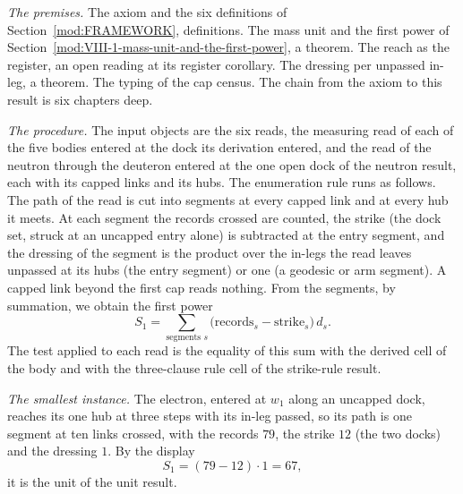 \begin{chproof}
\textit{The premises.} The axiom and the six definitions of Section~\ref{mod:FRAMEWORK}, definitions. The mass unit and the first power of Section~\ref{mod:VIII-1-mass-unit-and-the-first-power}, a theorem. The reach as the register, an open reading at its register corollary. The dressing per unpassed in-leg, a theorem. The typing of the cap census. The chain from the axiom to this result is six chapters deep.

\textit{The procedure.} The input objects are the six reads, the measuring read of each of the five bodies entered at the dock its derivation entered, and the read of the neutron through the deuteron entered at the one open dock of the neutron result, each with its capped links and its hubs. The enumeration rule runs as follows. The path of the read is cut into segments at every capped link and at every hub it meets. At each segment the records crossed are counted, the strike (the dock set, struck at an uncapped entry alone) is subtracted at the entry segment, and the dressing of the segment is the product over the in-legs the read leaves unpassed at its hubs (the entry segment) or one (a geodesic or arm segment). A capped link beyond the first cap reads nothing. From the segments, by summation, we obtain the first power
\begin{equation}
S_1=\sum_{\text{segments }s}\bigl(\mathrm{records}_s-\mathrm{strike}_s\bigr)\,d_s .
\end{equation}
The test applied to each read is the equality of this sum with the derived cell of the body and with the three-clause rule cell of the strike-rule result.

\textit{The smallest instance.} The electron, entered at $w_1$ along an uncapped dock, reaches its one hub at three steps with its in-leg passed, so its path is one segment at ten links crossed, with the records $79$, the strike $12$ (the two docks) and the dressing $1$. By the display
\begin{equation}
S_1=(79-12)\cdot 1 = 67 ,
\end{equation}
it is the unit of the unit result.


\end{chproof}
